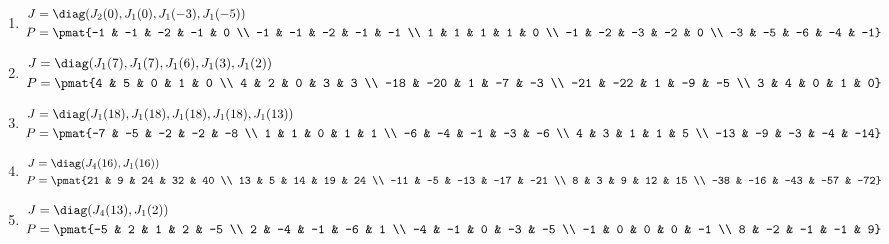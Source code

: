 \begin{enumerate}
\item

\begin{align*}
J &= \diag(J_{2}(0), J_{1}(0), J_{1}(-3), J_{1}(-5))\\
P &= \pmat{-1 & -1 & -2 & -1 & 0 \\ -1 & -1 & -2 & -1 & -1 \\ 1 & 1 & 1 & 1 & 0 \\ -1 & -2 & -3 & -2 & 0 \\ -3 & -5 & -6 & -4 & -1}
\end{align*}

\item

\begin{align*}
J &= \diag(J_{1}(7), J_{1}(7), J_{1}(6), J_{1}(3), J_{1}(2))\\
P &= \pmat{4 & 5 & 0 & 1 & 0 \\ 4 & 2 & 0 & 3 & 3 \\ -18 & -20 & 1 & -7 & -3 \\ -21 & -22 & 1 & -9 & -5 \\ 3 & 4 & 0 & 1 & 0}
\end{align*}

\item

\begin{align*}
J &= \diag(J_{1}(18), J_{1}(18), J_{1}(18), J_{1}(18), J_{1}(13))\\
P &= \pmat{-7 & -5 & -2 & -2 & -8 \\ 1 & 1 & 0 & 1 & 1 \\ -6 & -4 & -1 & -3 & -6 \\ 4 & 3 & 1 & 1 & 5 \\ -13 & -9 & -3 & -4 & -14}
\end{align*}

\item

\begin{align*}
J &= \diag(J_{4}(16), J_{1}(16))\\
P &= \pmat{21 & 9 & 24 & 32 & 40 \\ 13 & 5 & 14 & 19 & 24 \\ -11 & -5 & -13 & -17 & -21 \\ 8 & 3 & 9 & 12 & 15 \\ -38 & -16 & -43 & -57 & -72}
\end{align*}

\item

\begin{align*}
J &= \diag(J_{4}(13), J_{1}(2))\\
P &= \pmat{-5 & 2 & 1 & 2 & -5 \\ 2 & -4 & -1 & -6 & 1 \\ -4 & -1 & 0 & -3 & -5 \\ -1 & 0 & 0 & 0 & -1 \\ 8 & -2 & -1 & -1 & 9}
\end{align*}


\end{enumerate}
